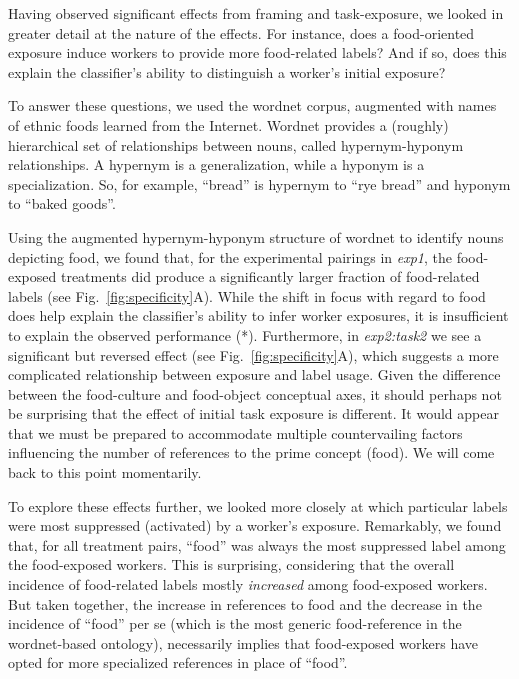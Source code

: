 \documentclass[12pt]{article}
\begin{document}
Having observed significant effects from framing and task-exposure,
we looked in greater detail at the nature of the effects.  For instance,
does a food-oriented exposure induce workers to provide more food-related
labels?  And if so, does this explain the classifier's ability to distinguish
a worker's initial exposure? 

To answer these questions, we used the wordnet corpus, augmented with names of
ethnic foods learned from the Internet.  Wordnet provides a (roughly)
hierarchical set of relationships between nouns, called hypernym-hyponym
relationships.  A hypernym is a generalization, while a hyponym is a 
specialization.  So, for example, ``bread'' is hypernym to ``rye bread'' 
and hyponym to ``baked goods''.

Using the augmented hypernym-hyponym structure of wordnet to identify nouns 
depicting food, we found that, for the experimental pairings in 
\textit{exp1}, the
food-exposed treatments did produce a significantly larger fraction of 
food-related labels (see Fig.~\ref{fig:specificity}A).  While the shift in 
focus with regard to food does help explain the classifier's ability to 
infer worker exposures, it is insufficient to explain the observed performance
(*).
Furthermore, in \textit{exp2:task2} we see a significant but reversed effect
(see Fig.~\ref{fig:specificity}A), which suggests a more complicated 
relationship between exposure and label usage.
Given the difference between the food-culture and food-object conceptual axes, 
it should perhaps not be surprising that the effect of initial task exposure 
is different.  It would appear that we must be prepared to accommodate 
multiple 
countervailing factors influencing the number of references to the prime 
concept (food).  We will come back to this point momentarily.

To explore these effects further, we looked more closely at which particular
labels were most suppressed (activated) by a worker's exposure.  Remarkably,
we found that, for all treatment pairs, ``food'' was always the most 
suppressed label among 
the food-exposed workers.  This is surprising, considering 
that the overall incidence of food-related labels mostly \textit{increased} 
among food-exposed workers.  But taken together, the increase in references to 
food 
and the decrease in the incidence of ``food'' per se (which is the most generic
food-reference in the wordnet-based ontology), necessarily implies that
food-exposed workers have opted for more specialized references in place of 
``food''. 
\end{document}
